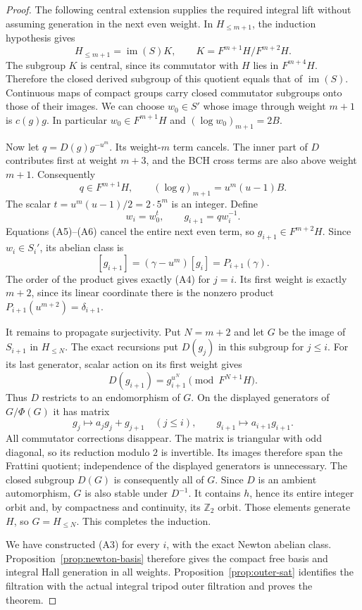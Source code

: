 \documentclass[11pt,a4paper]{article}
\theoremstyle{definition}
\begin{document}
\begin{proof}
The following central extension supplies the required
integral lift without assuming generation in the next even
weight. In $H_{\leq m+1}$, the induction hypothesis gives
\[
 H_{\leq m+1}=\operatorname{im}(S)K,\qquad
 K=F^{m+1}H/F^{m+2}H.
\]
The subgroup $K$ is central, since its commutator with $H$
lies in $F^{m+4}H$. Therefore the closed derived subgroup
of this quotient equals that of $\operatorname{im}(S)$.
Continuous maps of compact groups carry closed commutator
subgroups onto those of their images. We can choose
$w_0\in S'$ whose image through weight $m+1$ is $c(g)g$.
In particular $w_0\in F^{m+1}H$ and
$(\log w_0)_{m+1}=2B$.

Now let $q=D(g)g^{-u^m}$. Its weight-$m$ term cancels.
The inner part of $D$ contributes first at weight $m+3$,
and the BCH cross terms are also above weight $m+1$.
Consequently
\[
 q\in F^{m+1}H,\qquad
           (\log q)_{m+1}=u^m(u-1)B.               \tag{A6}
\]
The scalar $t=u^m(u-1)/2=2\cdot5^m$ is an integer.
Define
\[
 w_i=w_0^t,\qquad g_{i+1}=q w_i^{-1}.
\]
Equations (A5)--(A6) cancel the entire next even term,
so $g_{i+1}\in F^{m+2}H$. Since $w_i\in S_i'$, its
abelian class is
\[
 [g_{i+1}]=(\gamma-u^m)[g_i]=P_{i+1}(\gamma).
\]
The order of the product gives exactly (A4) for $j=i$.
Its first weight is exactly $m+2$, since its linear
coordinate there is the nonzero product
$P_{i+1}(u^{m+2})=\delta_{i+1}$.

It remains to propagate surjectivity. Put $N=m+2$ and
let $G$ be the image of $S_{i+1}$ in $H_{\leq N}$.
The exact recursions put $D(g_j)$ in this subgroup for
$j\leq i$. For its last generator, scalar action on
its first weight gives
\[
 D(g_{i+1})=g_{i+1}^{u^N}\pmod{F^{N+1}H}.
\]
Thus $D$ restricts to an endomorphism of $G$.
On the displayed generators of $G/\Phi(G)$ it has matrix
\[
 g_j\longmapsto a_jg_j+g_{j+1}\quad(j\leq i),
 \qquad g_{i+1}\longmapsto a_{i+1}g_{i+1}.
\]
All commutator corrections disappear. The matrix is
triangular with odd diagonal, so its reduction modulo
$2$ is invertible. Its images therefore span the Frattini
quotient; independence of the displayed generators is
unnecessary. The closed subgroup $D(G)$ is consequently
all of $G$. Since $D$ is an ambient automorphism, $G$ is
also stable under $D^{-1}$. It contains $h$, hence its
entire integer orbit and, by compactness and continuity,
its $\mathbb Z_2$ orbit. Those elements generate $H$,
so $G=H_{\leq N}$. This completes the induction.

We have constructed (A3) for every $i$, with the exact
Newton abelian class. Proposition~\ref{prop:newton-basis}
therefore gives the compact free basis and integral Hall
generation in all weights. Proposition~\ref{prop:outer-sat}
identifies the filtration with the actual integral tripod
outer filtration and proves the theorem.
\end{proof}
\end{document}
